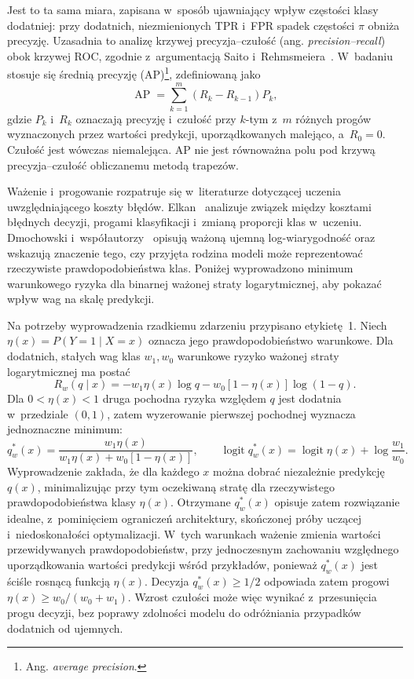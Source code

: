 Jest to ta sama miara, zapisana w~sposób ujawniający wpływ częstości klasy dodatniej: przy dodatnich, niezmienionych TPR i~FPR spadek częstości $\pi$ obniża precyzję. Uzasadnia to analizę krzywej precyzja--czułość (ang. \textit{precision--recall}) obok krzywej ROC, zgodnie z~argumentacją Saito i~Rehmsmeiera~\cite{saito2015pr}. W~badaniu stosuje się średnią precyzję (AP)\footnote{Ang. \textit{average precision}.}, zdefiniowaną jako
\begin{equation}
\operatorname{AP}=\sum_{k=1}^{m}(R_k-R_{k-1})P_k,
\label{eq:srednia-precyzja}
\end{equation}
gdzie $P_k$ i~$R_k$ oznaczają precyzję i~czułość przy $k$-tym z~$m$ różnych progów wyznaczonych przez wartości predykcji, uporządkowanych malejąco, a~$R_0=0$. Czułość jest wówczas niemalejąca. AP nie jest równoważna polu pod krzywą precyzja--czułość obliczanemu metodą trapezów.

Ważenie i~progowanie rozpatruje się w~literaturze dotyczącej uczenia uwzględniającego koszty błędów. Elkan~\cite{elkan2001cost} analizuje związek między kosztami błędnych decyzji, progami klasyfikacji i~zmianą proporcji klas w~uczeniu. Dmochowski i~współautorzy~\cite{dmochowski2010cost} opisują ważoną ujemną log-wiarygodność oraz wskazują znaczenie tego, czy przyjęta rodzina modeli może reprezentować rzeczywiste prawdopodobieństwa klas. Poniżej wyprowadzono minimum warunkowego ryzyka dla binarnej ważonej straty logarytmicznej, aby pokazać wpływ wag na skalę predykcji.

Na potrzeby wyprowadzenia rzadkiemu zdarzeniu przypisano etykietę~1. Niech $\eta(x)=P(Y=1\mid X=x)$ oznacza jego prawdopodobieństwo warunkowe. Dla dodatnich, stałych wag klas $w_1,w_0$ warunkowe ryzyko ważonej straty logarytmicznej ma postać
\begin{equation}
R_w(q\mid x)=-w_1\eta(x)\log q-w_0[1-\eta(x)]\log(1-q).
\label{eq:ryzyko-wazone}
\end{equation}
Dla $0<\eta(x)<1$ druga pochodna ryzyka względem $q$ jest dodatnia w~przedziale $(0,1)$, zatem wyzerowanie pierwszej pochodnej wyznacza jednoznaczne minimum:
\begin{equation}
q_w^*(x)=\frac{w_1\eta(x)}{w_1\eta(x)+w_0[1-\eta(x)]},
\qquad
\operatorname{logit}q_w^*(x)=\operatorname{logit}\eta(x)+\log\frac{w_1}{w_0}.
\label{eq:optimum-wazenia}
\end{equation}
Wyprowadzenie zakłada, że dla każdego $x$ można dobrać niezależnie predykcję $q(x)$, minimalizując przy tym oczekiwaną stratę dla rzeczywistego prawdopodobieństwa klasy $\eta(x)$. Otrzymane $q_w^*(x)$ opisuje zatem rozwiązanie idealne, z~pominięciem ograniczeń architektury, skończonej próby uczącej i~niedoskonałości optymalizacji. W~tych warunkach ważenie zmienia wartości przewidywanych prawdopodobieństw, przy jednoczesnym zachowaniu względnego uporządkowania wartości predykcji wśród przykładów, ponieważ $q_w^*(x)$ jest ściśle rosnącą funkcją $\eta(x)$. Decyzja $q_w^*(x)\geq 1/2$ odpowiada zatem progowi $\eta(x)\geq w_0/(w_0+w_1)$. Wzrost czułości może więc wynikać z~przesunięcia progu decyzji, bez poprawy zdolności modelu do odróżniania przypadków dodatnich od ujemnych.


